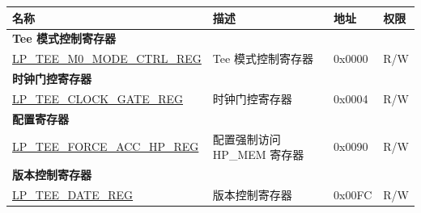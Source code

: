 \begin{longtable}{ | p{6cm} | p{7.2cm} | p{1.3cm} | p{1cm} | }
\hline\rowcolor{lightgray}
\textbf{名称} & \textbf{描述} &  \textbf{地址} & \textbf{权限} \\ \hline
\endhead
\multicolumn{4}{|l|}{\textbf{Tee 模式控制寄存器}} \\ \hline
\hyperref[regdesc:LPTEEM0MODECTRLREG]{LP\_TEE\_M0\_MODE\_CTRL\_REG} & Tee 模式控制寄存器 & 0x0000 & R/W \\ \hline
\multicolumn{4}{|l|}{\textbf{时钟门控寄存器}} \\ \hline
\hyperref[regdesc:LPTEECLOCKGATEREG]{LP\_TEE\_CLOCK\_GATE\_REG} & 时钟门控寄存器 & 0x0004 & R/W \\ \hline
\multicolumn{4}{|l|}{\textbf{配置寄存器}} \\ \hline
\hyperref[regdesc:LPTEEFORCEACCHPREG]{LP\_TEE\_FORCE\_ACC\_HP\_REG} & 配置强制访问 HP\_MEM 寄存器 & 0x0090 & R/W \\ \hline
\multicolumn{4}{|l|}{\textbf{版本控制寄存器}} \\ \hline
\hyperref[regdesc:LPTEEDATEREG]{LP\_TEE\_DATE\_REG} & 版本控制寄存器 & 0x00FC & R/W \\ \hline
\end{longtable}
